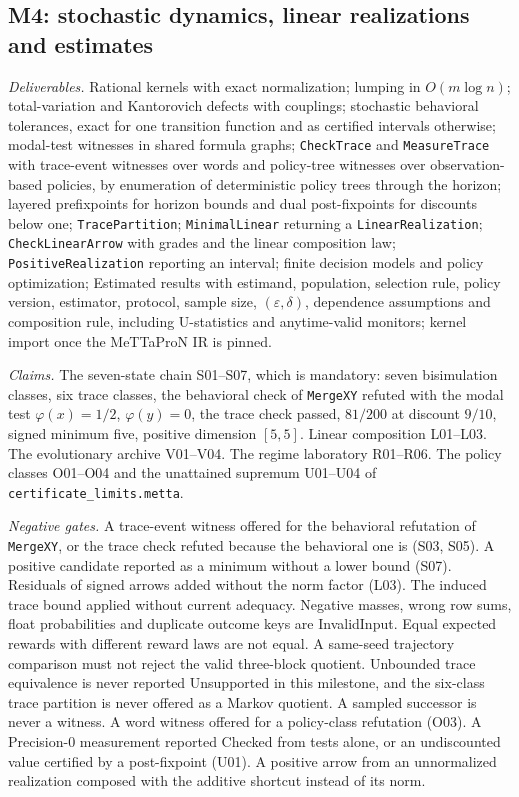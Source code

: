 \documentclass[11pt]{article}
\newcommand{\code}[1]{\texttt{#1}}
\begin{document}
\subsection{M4: stochastic dynamics, linear realizations and estimates}

\emph{Deliverables.} Rational kernels with exact normalization; lumping in $O(m\log n)$; total-variation
and Kantorovich defects with couplings; stochastic behavioral tolerances, exact for one transition
function and as certified intervals otherwise; modal-test witnesses in shared formula graphs;
\code{CheckTrace} and \code{MeasureTrace} with trace-event witnesses over words and policy-tree
witnesses over observation-based policies, by enumeration of deterministic policy trees through the
horizon; layered prefixpoints for horizon bounds and dual post-fixpoints for discounts below one;
\code{TracePartition};
\code{MinimalLinear} returning a \code{LinearRealization}; \code{CheckLinearArrow} with grades and the
linear composition law; \code{PositiveRealization} reporting an interval; finite decision models and
policy optimization; Estimated results with estimand, population, selection rule, policy version,
estimator, protocol, sample size, $(\varepsilon,\delta)$, dependence assumptions and composition
rule, including U-statistics and anytime-valid monitors; kernel import once the MeTTaProN IR is
pinned.

\emph{Claims.} The seven-state chain S01--S07, which is mandatory: seven bisimulation classes, six
trace classes, the behavioral check of \code{MergeXY} refuted with the modal test
$\varphi(x)=1/2$, $\varphi(y)=0$, the trace check passed, $81/200$ at discount $9/10$, signed minimum
five, positive dimension $[5,5]$. Linear composition L01--L03. The evolutionary archive V01--V04. The
regime laboratory R01--R06. The policy classes O01--O04 and the unattained supremum U01--U04 of
\code{certificate\_limits.metta}.

\emph{Negative gates.} A trace-event witness offered for the behavioral refutation of \code{MergeXY},
or the trace check refuted because the behavioral one is (S03, S05). A positive candidate reported as a
minimum without a lower bound (S07). Residuals of signed arrows added without the norm factor (L03). The
induced trace bound applied without current adequacy. Negative masses, wrong row sums, float
probabilities and duplicate outcome keys are InvalidInput. Equal expected rewards with different reward
laws are not equal. A same-seed trajectory comparison must not reject the valid three-block quotient.
Unbounded trace equivalence is never reported Unsupported in this milestone, and the six-class trace
partition is never offered as a Markov quotient. A sampled successor is never a witness. A word
witness offered for a policy-class refutation (O03). A Precision-0 measurement reported Checked from
tests alone, or an undiscounted value certified by a post-fixpoint (U01). A positive arrow from an
unnormalized realization composed with the additive shortcut instead of its norm.
\end{document}
